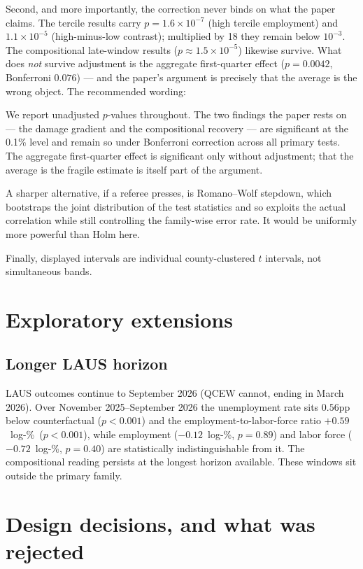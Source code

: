 \documentclass[11pt,a4paper]{article}
\newcommand{\lp}{log-\%}
\begin{document}
Second, and more importantly, the correction never binds on what the paper claims. The tercile results
carry $p=1.6\times10^{-7}$ (high tercile employment) and $1.1\times10^{-5}$ (high-minus-low contrast);
multiplied by 18 they remain below $10^{-3}$. The compositional late-window results
($p\approx1.5\times10^{-5}$) likewise survive. What does \emph{not} survive adjustment is the aggregate
first-quarter effect ($p=0.0042$, Bonferroni $0.076$) --- and the paper's argument is precisely that the
average is the wrong object. The recommended wording:

\begin{plainbox}
We report unadjusted $p$-values throughout. The two findings the paper rests on --- the damage gradient
and the compositional recovery --- are significant at the 0.1\% level and remain so under Bonferroni
correction across all primary tests. The aggregate first-quarter effect is significant only without
adjustment; that the average is the fragile estimate is itself part of the argument.
\end{plainbox}

A sharper alternative, if a referee presses, is Romano--Wolf stepdown, which bootstraps the joint
distribution of the test statistics and so exploits the actual correlation while still controlling the
family-wise error rate. It would be uniformly more powerful than Holm here.

Finally, displayed intervals are individual county-clustered $t$ intervals, not simultaneous bands.

\section{Exploratory extensions}

\subsection{Longer LAUS horizon}
LAUS outcomes continue to September 2026 (QCEW cannot, ending in March 2026). Over November
2025--September 2026 the unemployment rate sits $0.56$pp below counterfactual ($p<0.001$) and the
employment-to-labor-force ratio $+0.59$~\lp\ ($p<0.001$), while employment ($-0.12$~\lp, $p=0.89$) and
labor force ($-0.72$~\lp, $p=0.40$) are statistically indistinguishable from it. The compositional
reading persists at the longest horizon available. These windows sit outside the primary family.

\section{Design decisions, and what was rejected}
\end{document}
